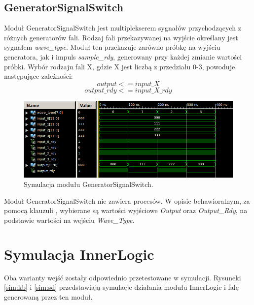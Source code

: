 \documentclass[a4paper,12pt]{article}
\begin{document}
\subsection{GeneratorSignalSwitch}

Moduł GeneratorSignalSwitch jest multiplekserem sygnałów przychodzących z różnych generatorów fali. Rodzaj fali przekazywanej na wyjście określany jest sygnałem \textit{wave\_type}. Moduł ten przekazuje zarówno próbkę na wyjściu generatora, jak i impuls \textit{sample\_rdy}, generowany przy każdej zmianie wartości próbki. Wybór rodzaju fali X, gdzie X jest liczbą z przedziału 0-3, powoduje następujące zależności:
\[output <= input\_X\]
\[output\_rdy <= input\_X\_rdy\]

\begin{figure}[H]
  \centering
  \includegraphics[decodearray={1 0 1 0 1 0}, width=\linewidth]{images/generator_signal_switch.png}
  \caption{Symulacja modułu GeneratorSignalSwitch.}
  \label{sim:gen_signal_switch}
\end{figure}

Moduł GeneratorSignalSwitch nie zawiera procesów. W opisie behawioralnym, za pomocą klauzuli , wybierane są wartości wyjściowe \textit{Output} oraz \textit{Output\_Rdy}, na podstawie wartości na wejściu \textit{Wave\_Type}.

\section{Symulacja InnerLogic}
Oba warianty wejść zostały odpowiednio przetestowane w symulacji. Rysuneki \ref{sim:kb} i \ref{sim:sd} przedstawiają symulacje działania modułu InnerLogic i falę generowaną przez ten moduł.
\end{document}
